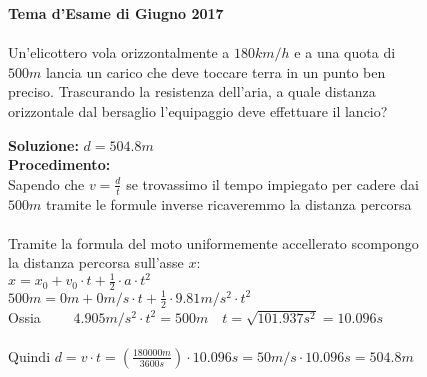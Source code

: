 \begin{figure}[h!]
\textbf{Tema d'Esame di Giugno 2017}\\ \\
Un'elicottero vola orizzontalmente a $180 km/h$ e a una quota di $500 m$ lancia
un carico che deve toccare terra in un punto ben preciso. Trascurando la resistenza
dell’aria, a quale distanza orizzontale dal bersaglio l'equipaggio deve effettuare il
lancio? \\
\begin{boxed}
    \null\hfill \textbf{Soluzione:} $d = 504.8m$\\
    \textbf{Procedimento:}  \\ 
Sapendo che $v=\frac{d}{t}$ se trovassimo il tempo impiegato per cadere dai $500m$ tramite le formule inverse ricaveremmo la distanza percorsa\\ \\
Tramite la formula del moto uniformemente accellerato scompongo la distanza percorsa sull'asse $x$:\\
$x=x_0 + v_0\cdot t + \frac{1}{2}\cdot a \cdot t^2 $\\
$500m= 0m + 0m/s\cdot t + \frac{1}{2}\cdot 9.81m/s^2\cdot t^2 \qquad$ \\
Ossia $\qquad 4.905m/s^2\cdot t^2=500m \quad t=\sqrt{101.937s^2}=10.096s $\\ \\
Quindi $d=v\cdot t=(\frac{180 000m}{3 600s})\cdot 10.096s=50m/s\cdot 10.096s=504.8m$
\end{boxed}
\end{figure}


